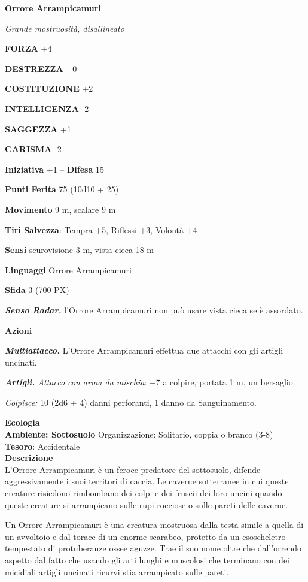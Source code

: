 \begin{multicols}{2}
	\medskip{}\textbf{Orrore Arrampicamuri}

	\textit{Grande mostruosità, disallineato}

	\textbf{FORZA} +4

	\textbf{DESTREZZA} +0

	\textbf{COSTITUZIONE} +2

	\textbf{INTELLIGENZA} -2

	\textbf{SAGGEZZA} +1

	\textbf{CARISMA} -2

	\textbf{Iniziativa} +1 -- \textbf{Difesa} 15

	\textbf{Punti Ferita} 75 (10d10 + 25)

	\textbf{Movimento} 9 m, scalare 9 m

	\textbf{Tiri Salvezza}: Tempra +5, Riflessi +3, Volontà +4

	\textbf{Sensi} scurovisione 3 m, vista cieca 18 m

	\textbf{Linguaggi} Orrore Arrampicamuri

	\textbf{Sfida} 3 (700 PX)

	\textit{\textbf{Senso Radar.}} l'Orrore Arrampicamuri non può usare vista cieca se è assordato.

	\textbf{Azioni}

	\textit{\textbf{Multiattacco.}} L'Orrore Arrampicamuri effettua due attacchi con gli artigli uncinati.

	\textit{\textbf{Artigli.} Attacco con arma da mischia}: +7 a colpire, portata 1 m, un bersaglio.

	\textit{Colpisce:} 10 (2d6 + 4) danni perforanti, 1 danno da Sanguinamento.

	\textbf{Ecologia}\\
	\textbf{Ambiente: Sottosuolo}
	Organizzazione: Solitario, coppia o branco (3-8)\\
	\textbf{Tesoro}: Accidentale\\
	\textbf{Descrizione}\\
	L'Orrore Arrampicamuri è un feroce predatore del sottosuolo, difende aggressivamente i suoi territori di caccia. Le caverne sotterranee in cui queste creature risiedono rimbombano dei colpi e dei fruscii dei loro uncini quando queste creature si arrampicano sulle rupi rocciose o sulle pareti delle caverne.

	Un Orrore Arrampicamuri è una creatura mostruosa dalla testa simile a quella di un avvoltoio e dal torace di un enorme scarabeo, protetto da un esoscheletro tempestato di protuberanze ossee aguzze. Trae il suo nome oltre che dall'orrendo aspetto dal fatto che usando gli arti lunghi e muscolosi che terminano con dei micidiali artigli uncinati ricurvi stia arrampicato sulle pareti.


\end{multicols}
